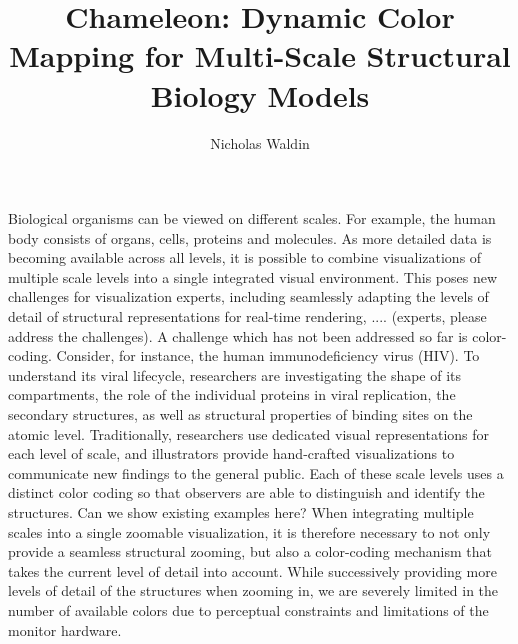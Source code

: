 \documentclass[review,journal]{vgtc}         %
\title{Chameleon: Dynamic Color Mapping	for Multi-Scale Structural Biology Models}
\author{Nicholas Waldin}
\begin{document}


\maketitle


Biological organisms can be viewed on different scales. For example, the human body consists of organs, cells, proteins and molecules. As more detailed data is becoming available across all levels, it is possible to combine visualizations of multiple scale levels into a single integrated visual environment. This poses new challenges for visualization experts, including seamlessly adapting the levels of detail of structural representations for real-time rendering, .... (experts, please address the challenges). \newline
A challenge which has not been addressed so far is color-coding. Consider, for instance, the human immunodeficiency virus (HIV). To understand its viral lifecycle, researchers are investigating the shape of its compartments, the role of the individual proteins in viral replication, the secondary structures, as well as structural properties of binding sites on the atomic level. Traditionally, researchers use dedicated visual representations for each level of scale, and illustrators provide hand-crafted visualizations to communicate new findings to the general public. Each of these scale levels uses a distinct color coding so that observers are able to distinguish and identify the structures. Can we show existing examples here? \newline
When integrating multiple scales into a single zoomable visualization, it is therefore necessary to not only provide a seamless structural zooming, but also a color-coding mechanism that takes the current level of detail into account. While successively providing more levels of detail of the structures when zooming in, we are severely limited in the number of available colors due to perceptual constraints and limitations of the monitor hardware. \newline
\end{document}
